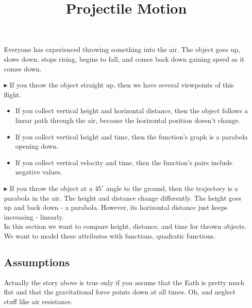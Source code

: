 \documentclass{ximera}
\title{Projectile Motion}
\begin{document}
\begin{abstract}
\end{abstract}
\maketitle



Everyone has experienced throwing something into the air. The object goes up, slows down, stops rising, begins to fall, and comes back down gaining speed as it comes down.  





$\blacktriangleright$ If you throw the object straight up, then we have several viewpoints of this flight. 

\begin{itemize}
\item If you collect vertical height and horizontal distance, then the object follows a linear path through the air, because the horizontal position doesn't change.  
\item If you collect vertical height and time, then the function's graph is a parabola opening down.
\item If you collect vertical velocity and time, then the function's pairs include negative values.
\end{itemize}




$\blacktriangleright$  If you throw the object at a $45^{\circ}$ angle to the ground, then the trajectory is a parabola in the air.  The height and distance change differently.  The height goes up and back down - a parabola.  However, its horizontal distance just keeps increasing - linearly. \\


In this section we want to compare height, distance, and time for thrown objects. \\

We want to model these attributes with functions, quadratic functions.



\subsection*{Assumptions}

Actually the story above is true only if you assume that the Eath is pretty much flat and that the gravitational force points down at all times. Oh, and neglect stuff like air resistance.
\end{document}
